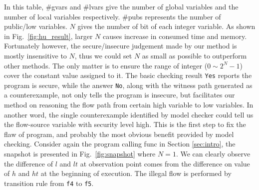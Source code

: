 \documentclass{llncs}
\begin{document}
In this table, \#gvars and \#lvars give the number of global
variables and the number of local variables respectively. \#pubs
represents the number of public/\textsf{low} variables. $N$ gives
the number of bit of each integer variable. As shown in
Fig.~\ref{fig:hu_result}, larger $N$ causes increase in consumed
time and memory. Fortunately however, the secure/insecure judgement
made by our method is mostly insensitive to $N$, thus we could set
$N$ as small as possible to outperform other methods. The only
matter is to ensure the range of integer ($0\sim 2^N-1$) cover the
constant value assigned to it. The basic checking result
\texttt{Yes} reports the program is secure, while the answer
\texttt{No}, along with the witness path generated as a
counterexample, not only tells the program is insecure, but
facilitates our method on reasoning the flow path from certain
\textsf{high} variable to \textsf{low} variables. In another word,
the single counterexample identified by model checker could tell us
the flow-source variable with security level \textsf{high}. This is
the first step to fix the flaw of program, and probably the most
obvious benefit provided by model checking. Consider again the
program calling \textsf{func} in Section \ref{sec:intro}, the
snapshot is presented in Fig.~\ref{fig:snapshot} where $N=1$. We can
clearly observe the difference of $l$ and $lt$ at observation point
comes from the difference on value of $h$ and $ht$ at the beginning
of execution. The illegal flow is performed by transition rule from
\texttt{f4} to \texttt{f5}.
\end{document}
